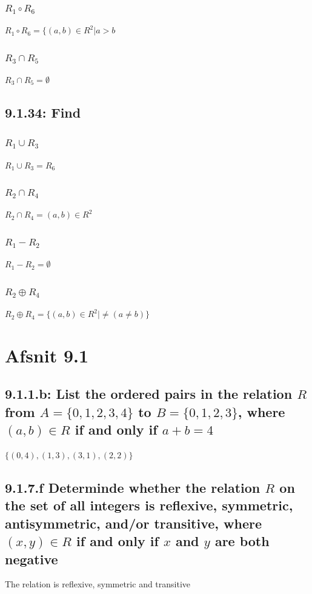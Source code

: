 \documentclass[12pt, a4paper]{report}
\begin{document}
					\subsubsection{$R_1 \circ R_6$}
						$R_1\circ R_6 = \{(a,b)\in R^2|a>b$
					\subsubsection{$R_3\cap R_5$}
						$R_3\cap R_5 = \emptyset$
				\setcounter{subsection}{33}
				\subsection{9.1.34: Find}
					\subsubsection{$R_1\cup R_3$}
						$R_1\cup R_3 = R_6$
					\setcounter{subsubsection}{2}
					\subsubsection{$R_2\cap R_4$}
						$R_2\cap R_4=(a,b)\in R^2$
					\setcounter{subsubsection}{4}
					\subsubsection{$R_1-R_2$}
						$R_1-R_2=\emptyset$
					\setcounter{subsubsection}{7}
					\subsubsection{$R_2\oplus R_4$}
						$R_2\oplus R_4 = \{(a,b)\in R^2|\neq(a\neq b)\}$
			\setcounter{section}{0}
			\section{Afsnit 9.1}
				\setcounter{subsection}{0}
				\subsection{9.1.1.b: List the ordered pairs in the relation $R$ from $A=\{0,1,2,3,4\}$ to $B=\{0,1,2,3\}$, where $(a,b)\in R$ if and only if $a+b=4$}
					$\{(0,4),(1,3),(3,1),(2,2)\}$
				\setcounter{subsection}{6}
				\subsection{9.1.7.f Determinde whether the relation $R$ on the set of all integers is reflexive, symmetric, antisymmetric, and/or transitive, where $(x,y)\in R$ if and only if $x$ and $y$ are both negative}
					The relation is reflexive, symmetric and transitive
				\setcounter{subsection}{31}
\end{document}
